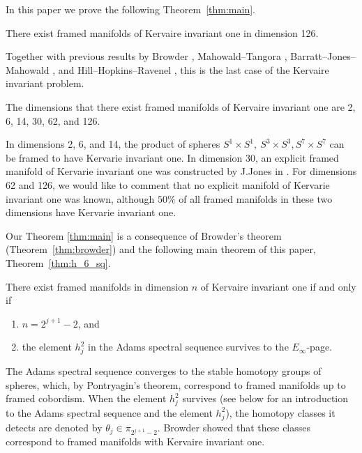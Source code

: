\documentclass{amsart}
\numberwithin{equation}{section}
\begin{document}
%

In this paper we prove the following Theorem~\ref{thm:main}.

\begin{theorem} \label{thm:main}
    There exist framed manifolds of Kervaire invariant one in dimension 126.
\end{theorem}

Together with previous results by Browder \cite{Browder}, Mahowald--Tangora \cite{MahowaldTangora}, Barratt--Jones--Mahowald \cite{BJMtheta5}, and Hill--Hopkins--Ravenel \cite{HHR}, this is the last case of the Kervaire invariant problem.

\begin{corollary}
  The dimensions that there exist framed manifolds of Kervaire invariant one are 2, 6, 14, 30, 62, and 126.  
\end{corollary}

In dimensions 2, 6, and 14, the product of spheres $S^1 \times S^1, \ S^3 \times S^3, S^7 \times S^7$ can be framed to have Kervarie invariant one.
In dimension 30, an explicit framed manifold of Kervarie invariant one was constructed by J.Jones in \cite{Jones30}. For dimensions 62 and 126, we would like to comment that no explicit manifold of Kervarie invariant one was known, although $50\%$ of all framed manifolds in these two dimensions have Kervarie invariant one.

Our Theorem \ref{thm:main} is a consequence of Browder's theorem (Theorem~\ref{thm:browder}) and the following main theorem of this paper, Theorem~\ref{thm:h_6_sq}. 

\begin{theorem} \label{thm:browder}
   There exist framed manifolds in dimension $n$ of Kervaire invariant one if and only if
   \begin{enumerate}
       \item $n=2^{j+1}-2$, and
       \item the element $h_j^2$ in the Adams spectral sequence survives to the $E_\infty$-page.
   \end{enumerate}
\end{theorem}


The Adams spectral sequence \cite{Adams58} converges to the stable homotopy groups of spheres, which, by Pontryagin's theorem, correspond to framed manifolds up to framed cobordism. When the element $h_j^2$ survives (see below for an introduction to the Adams spectral sequence and the element $h_j^2$), the homotopy classes it detects are denoted by $\theta_j \in \pi_{2^{j+1}-2}$. Browder showed that these classes correspond to framed manifolds with Kervaire invariant one. 
\end{document}

